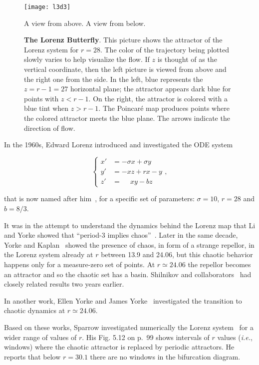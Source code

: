 \documentclass{article}
\def\rhoo{r}
\def\betaa{b}
\newcommand{\ie}{{\it{i.e.}}}
\newcommand{\beq}{\begin{linenomath}\begin{equation}} %
\newcommand{\eeq}{\end{equation}\end{linenomath}} %
\begin{document}
\begin{figure}
 \centering
\texttt{[image: l3d3]}
\centerline{A view from above.\hskip2.5cm A view from below.}
 \caption{{\bf The Lorenz Butterfly}. 
    This picture shows the attractor of the Lorenz system for $r=28$. 
    The color of the trajectory being plotted slowly varies to help visualize the flow.
    If $z$ is thought of as the vertical coordinate, then the left picture is viewed from above and the right one from the side. 
    In the left, blue represents the $z=r-1=27$ horizontal plane; the attractor appears dark blue for points with $z<r-1$. 
    On the right, the attractor is colored with a blue tint when $z>r-1$.
    The Poincar\'e map produces points where the colored attractor meets the blue plane. 
    The arrows indicate the direction of flow. 
 }
 \label{fig:butterfly}
\end{figure} 


In the 1960s, Edward Lorenz introduced and investigated the ODE system 
%
\beq
\begin{cases}
\label{eq:Lor}
x' &=-\sigma x +\sigma y  \\
y' &=-xz+\rhoo x -y\\
z' &=\phantom{+}xy - \betaa z  %
\end{cases},
\eeq
%
that is now named after him~\cite{Lor63}, for a specific set of parameters: $\sigma=10$, $\rhoo = 28$ and $\betaa=8/3$. 

It was in the attempt to understand the dynamics behind the Lorenz map that Li and Yorke showed that ``period-3 implies chaos''~\cite{LY75}. Later in the same decade, Yorke and Kaplan~\cite{KY79} showed the presence of chaos, in form of a strange repellor, in the Lorenz system already at $\rhoo$ between 13.9 and 24.06, but this chaotic behavior happens only for a measure-zero set of points. At $\rhoo\simeq24.06$ the repellor becomes an attractor and so the chaotic set has a basin. Shilnikov and collaborators~\cite{ABS77} had closely related results two years earlier.

In another work, Ellen Yorke and James Yorke~\cite{YY79} investigated the transition to chaotic dynamics at $\rhoo\simeq24.06$.

Based on these works, Sparrow investigated numerically  the Lorenz system~\cite{Spa82} for a wider range of values of $\rhoo$. His Fig. 5.12 on p.~99 shows intervals of $\rhoo$ values (\ie, windows) where the chaotic attractor is replaced by periodic attractors. He reports that below $\rhoo=30.1$ there are no windows in the bifurcation diagram. 
\end{document}
